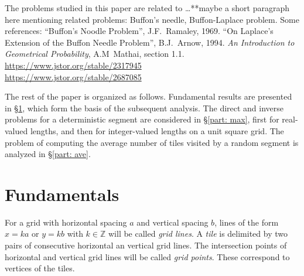 \documentclass[12pt, a4paper]{article}
\newcommand{\touched}{visited}
\begin{document}

The problems studied in this paper are related to \ldots ***maybe a short paragraph here mentioning related problems: Buffon's needle, Buffon-Laplace problem. Some references: ``Buffon's Noodle Problem'', J.F.~Ramaley, 1969. ``On Laplace's Extension of the Buffon Needle Problem'', B.J.~Arnow, 1994. \emph{An Introduction to Geometrical Probability}, A.M~Mathai, section 1.1. \\
\url{https://www.jstor.org/stable/2317945} \\
\url{https://www.jstor.org/stable/2687085}

The rest of the paper is organized as follows. Fundamental results are presented in \S\ref{part: fund results}, which form the basis of the subsequent analysis. The direct and inverse problems for a deterministic segment are considered in \S\ref{part: max}, first for real-valued lengths, and then for integer-valued lengths on a unit square grid. The problem of computing the average number of tiles \touched{} by a random segment is analyzed in \S\ref{part: ave}.



\section{Fundamentals}
\label{part: fund results}

For a grid with horizontal spacing $a$ and vertical spacing $b$, lines of the form $x = ka$ or $y = kb$ with $k \in \mathbb Z$ will be called \emph{grid lines}. A \emph{tile} is delimited by two pairs of consecutive horizontal an vertical grid lines. The intersection points of horizontal and vertical grid lines will be called \emph{grid points}. These correspond to vertices of the tiles.
\end{document}
